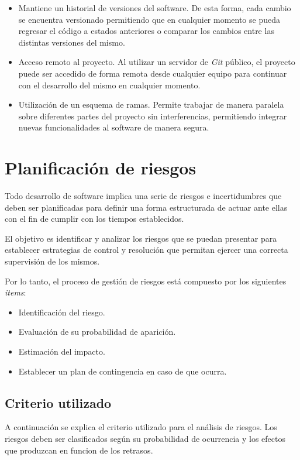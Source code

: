 \begin{itemize}
	\item Mantiene un historial de versiones del software. De esta forma, cada cambio se encuentra versionado permitiendo que en cualquier momento se pueda regresar el código a estados anteriores o comparar los cambios entre las distintas versiones del mismo.   
	\item Acceso remoto al proyecto. Al utilizar un servidor de \textit{Git} público, el proyecto puede ser accedido de forma remota desde cualquier equipo para continuar con el desarrollo del mismo en cualquier momento.
	\item Utilización de un esquema de ramas. Permite trabajar de manera paralela sobre diferentes partes del proyecto sin interferencias, permitiendo integrar nuevas funcionalidades al software de manera segura.
\end{itemize}

\section{Planificación de riesgos}
Todo desarrollo de software implica una serie de riesgos e incertidumbres que deben ser planificadas para definir una forma estructurada de actuar ante ellas con el fin de cumplir con los tiempos establecidos.

El objetivo es identificar y analizar los riesgos que se puedan presentar para establecer estrategias de control y resolución que permitan ejercer una correcta supervisión de los mismos.

Por lo tanto, el proceso de gestión de riesgos está compuesto por los siguientes \textit{items}:

\begin{itemize}
	\item Identificación del riesgo.
  \item Evaluación de su probabilidad de aparición.
  \item Estimación del impacto.
  \item Establecer un plan de contingencia en caso de que ocurra.
\end{itemize}

\subsection{Criterio utilizado}
A continuación se explica el criterio utilizado para el análisis de riesgos. Los riesgos deben ser clasificados según su probabilidad de ocurrencia y los efectos que produzcan en funcion de los retrasos. 

